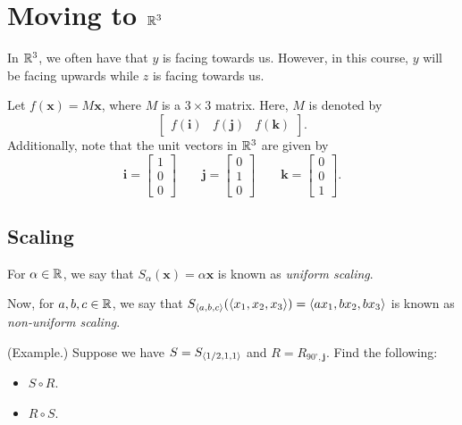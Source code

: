 \documentclass[letterpaper]{article}
\begin{document}
\section{Moving to \texorpdfstring{$\mathbb{R}^3$}{Three-Dimensions}}
In $\mathbb{R}^3$, we often have that $y$ is facing towards us. However, in this course, $y$ will be facing upwards while $z$ is facing towards us. 

\bigskip 

Let $f(\mathbf{x}) = M\mathbf{x}$, where $M$ is a $3 \times 3$ matrix. Here, $M$ is denoted by 
\[\begin{bmatrix}
    f(\mathbf{i}) & f(\mathbf{j}) & f(\mathbf{k})
\end{bmatrix}.\]
Additionally, note that the unit vectors in $\mathbb{R}^3$ are given by 
\[\mathbf{i} = \begin{bmatrix}
    1 \\ 0 \\ 0
\end{bmatrix} \qquad \mathbf{j} = \begin{bmatrix}
    0 \\ 1 \\ 0
\end{bmatrix} \qquad \mathbf{k} = \begin{bmatrix}
    0 \\ 0 \\ 1
\end{bmatrix}.\]

\subsection{Scaling}
For $\alpha \in \mathbb{R}$, we say that $S_{\alpha}(\mathbf{x}) = \alpha \mathbf{x}$ is known as \emph{uniform scaling}.

\bigskip 

Now, for $a, b, c \in \mathbb{R}$, we say that $S_{\langle a, b, c \rangle}(\langle x_1, x_2, x_3 \rangle) =\langle ax_1, bx_2, bx_3 \rangle$ is known as \emph{non-uniform scaling}.


\begin{mdframed}[]
    (Example.) Suppose we have $S = S_{\langle 1/2, 1, 1 \rangle}$ and $R = R_{90^{\circ}, \mathbf{j}}$. Find the following: 
    \begin{itemize}
        \item $S \circ R$.
        \item $R \circ S$. 
    \end{itemize}
\end{mdframed}
\end{document}
